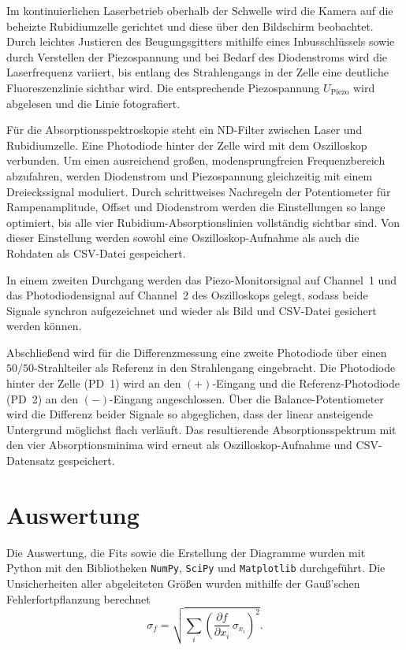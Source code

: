 Im kontinuierlichen Laserbetrieb oberhalb der Schwelle wird die Kamera auf die beheizte Rubidiumzelle gerichtet und diese über den Bildschirm beobachtet. Durch leichtes Justieren des Beugungsgitters mithilfe eines Inbusschlüssels sowie durch Verstellen der Piezospannung und bei Bedarf des Diodenstroms wird die Laserfrequenz variiert, bis entlang des Strahlengangs in der Zelle eine deutliche Fluoreszenzlinie sichtbar wird. Die entsprechende Piezospannung $U_{\text{Piezo}}$ wird abgelesen und die Linie fotografiert.

Für die Absorptionsspektroskopie steht ein ND-Filter zwischen Laser und Rubidiumzelle. Eine Photodiode hinter der Zelle wird mit dem Oszilloskop verbunden. Um einen ausreichend großen, modensprungfreien Frequenzbereich abzufahren, werden Diodenstrom und Piezospannung gleichzeitig mit einem Dreieckssignal moduliert. Durch schrittweises Nachregeln der Potentiometer für Rampenamplitude, Offset und Diodenstrom werden die Einstellungen so lange optimiert, bis alle vier Rubidium-Absorptionslinien vollständig sichtbar sind. Von dieser Einstellung werden sowohl eine Oszilloskop-Aufnahme als auch die Rohdaten als CSV-Datei gespeichert.

In einem zweiten Durchgang werden das Piezo-Monitorsignal auf Channel~1 und das Photodiodensignal auf Channel~2 des Oszilloskops gelegt, sodass beide Signale synchron aufgezeichnet und wieder als Bild und CSV-Datei gesichert werden können.

Abschließend wird für die Differenzmessung eine zweite Photodiode über einen $50/50$-Strahlteiler als Referenz in den Strahlengang eingebracht. Die Photodiode hinter der Zelle (PD~1) wird an den $(+)$-Eingang und die Referenz-Photodiode (PD~2) an den $(-)$-Eingang angeschlossen. Über die Balance-Potentiometer wird die Differenz beider Signale so abgeglichen, dass der linear ansteigende Untergrund möglichst flach verläuft. Das resultierende Absorptionsspektrum mit den vier Absorptionsminima wird erneut als Oszilloskop-Aufnahme und CSV-Datensatz gespeichert.

\section{Auswertung}

Die Auswertung, die Fits sowie die Erstellung der Diagramme wurden mit Python mit den Bibliotheken \texttt{NumPy}, \texttt{SciPy} und \texttt{Matplotlib} durchgeführt. Die Unsicherheiten aller abgeleiteten Größen wurden mithilfe der Gauß'schen Fehlerfortpflanzung berechnet
\begin{equation*}
    \sigma_f = \sqrt{\sum_{i} \left(\frac{\partial f}{\partial x_i}\,\sigma_{x_i}\right)^2}.
\end{equation*}


